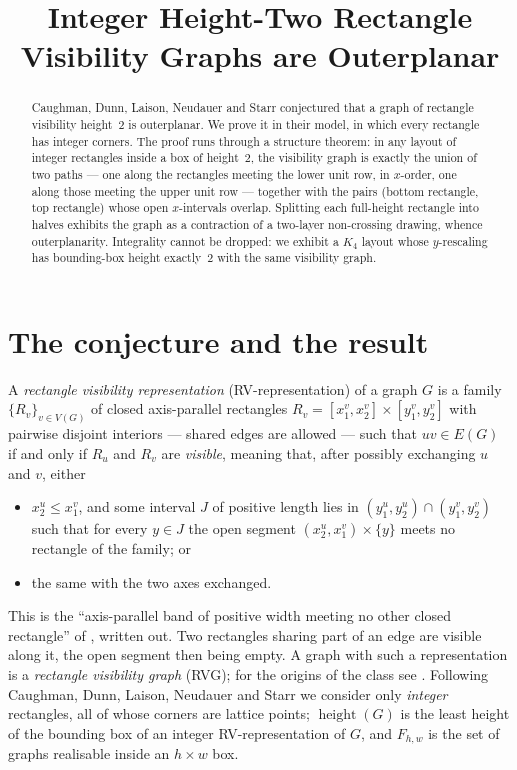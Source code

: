 \documentclass[11pt]{amsart}
\title[Integer height-two RVGs are outerplanar]
{Integer Height-Two Rectangle Visibility Graphs are Outerplanar}
\date{}
\theoremstyle{remark}
\newcommand{\height}{\operatorname{height}}
\begin{document}
\begin{abstract}
Caughman, Dunn, Laison, Neudauer and Starr conjectured that a graph of rectangle
visibility height~$2$ is outerplanar. We prove it in their model, in which every
rectangle has integer corners. The proof runs through a structure theorem: in any
layout of integer rectangles inside a box of height~$2$, the visibility graph is
exactly the union of two paths --- one along the rectangles meeting the lower unit
row, in $x$-order, one along those meeting the upper unit row --- together with the
pairs (bottom rectangle, top rectangle) whose open $x$-intervals overlap. Splitting
each full-height rectangle into halves exhibits the graph as a contraction of a
two-layer non-crossing drawing, whence outerplanarity. Integrality cannot be dropped:
we exhibit a $K_4$ layout whose $y$-rescaling has bounding-box height exactly~$2$ with
the same visibility graph.
\end{abstract}

\maketitle

\section{The conjecture and the result}

A \emph{rectangle visibility representation} (RV-representation) of a graph $G$ is a
family $\{R_v\}_{v\in V(G)}$ of closed axis-parallel rectangles
$R_v=[x_1^v,x_2^v]\times[y_1^v,y_2^v]$ with pairwise disjoint interiors --- shared edges
are allowed --- such that $uv\in E(G)$ if and only if $R_u$ and $R_v$ are
\emph{visible}, meaning that, after possibly exchanging $u$ and $v$, either
\begin{itemize}
\item[(h)] $x_2^u\le x_1^v$, and some interval $J$ of positive length lies in
 $(y_1^u,y_2^u)\cap(y_1^v,y_2^v)$ such that for every $y\in J$ the open segment
 $(x_2^u,x_1^v)\times\{y\}$ meets no rectangle of the family; or
\item[(v)] the same with the two axes exchanged.
\end{itemize}
This is the ``axis-parallel band of positive width meeting no other closed rectangle''
of \cite{CDLNS23}, written out. Two rectangles sharing part of an edge
are visible along it, the open segment then being empty. A graph with such a
representation is a \emph{rectangle visibility graph} (RVG); for the origins of the
class see \cite{HSV}. Following
Caughman, Dunn, Laison, Neudauer and Starr \cite[\S2]{CDLNS23} we consider only
\emph{integer} rectangles, all of whose corners are lattice points; $\height(G)$ is the
least height of the bounding box of an integer RV-representation of $G$, and
$F_{h,w}$ is the set of graphs realisable inside an $h\times w$ box.
\end{document}
